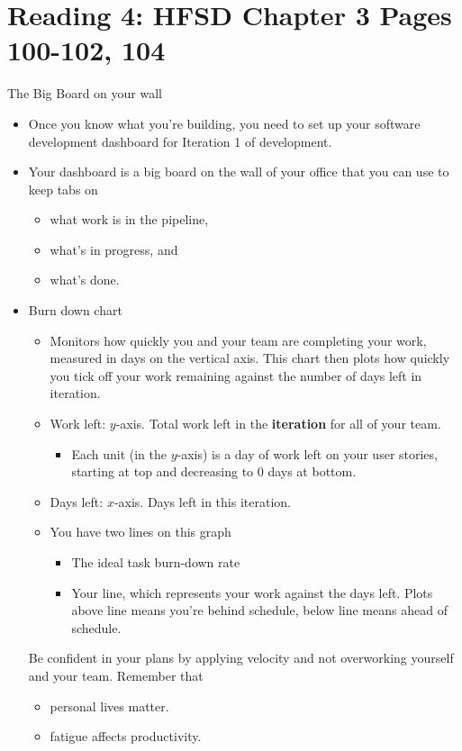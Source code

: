 \documentclass[letterpaper]{article}
\begin{document}
\section{Reading 4: HFSD Chapter 3 Pages 100-102, 104}
The Big Board on your wall 

\begin{itemize}
    \item Once you know what you're building, you need to set up your software development dashboard for Iteration 1 of development.
    \item Your dashboard is a big board on the wall of your office that you can use to keep tabs on 
    \begin{itemize}
        \item what work is in the pipeline, 
        \item what's in progress, and 
        \item what's done.
    \end{itemize}
    \item Burn down chart 
    \begin{itemize}
        \item Monitors how quickly you and your team are completing your work, measured in days on the vertical axis. This chart then plots how quickly you tick off your work remaining against the number of days left in iteration. 
        \item Work left: $y$-axis. Total work left in the \textbf{iteration} for all of your team. 
        \begin{itemize}
            \item Each unit (in the $y$-axis) is a day of work left on your user stories, starting at top and decreasing to 0 days at bottom. 
        \end{itemize}
        \item Days left: $x$-axis. Days left in this iteration.
        \item You have two lines on this graph 
        \begin{itemize}
            \item The ideal task burn-down rate 
            \item Your line, which represents your work against the days left. Plots above line means you're behind schedule, below line means ahead of schedule. 
        \end{itemize}
    \end{itemize}
    \begin{mdframed}
        Be confident in your plans by applying velocity and not overworking yourself and your team. Remember that 
        \begin{itemize}
            \item personal lives matter. 
            \item fatigue affects productivity. 
        \end{itemize}
    \end{mdframed}
\end{itemize}
\end{document}
